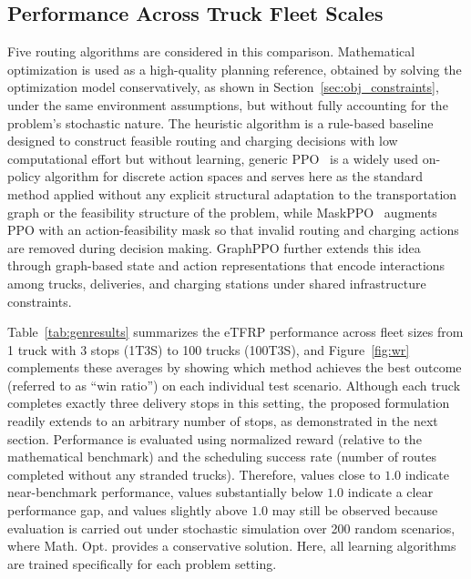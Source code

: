 \documentclass[a4paper,fleqn]{cas-sc}
\begin{document}
\subsection{Performance Across Truck Fleet Scales}

Five routing algorithms are considered in this comparison. Mathematical optimization is used as a high-quality planning reference, obtained by solving the optimization model conservatively, as shown in Section~\ref{sec:obj_constraints}, under the same environment assumptions, but without fully accounting for the problem's stochastic nature.
The heuristic algorithm is a rule-based baseline designed to construct feasible routing and charging decisions with low computational effort but without learning, generic PPO~\cite{ppo} is a widely used on-policy algorithm for discrete action spaces and serves here as the standard method applied without any explicit structural adaptation to the transportation graph or the feasibility structure of the problem, while MaskPPO~\cite{maskppo} augments PPO with an action-feasibility mask so that invalid routing and charging actions are removed during decision making. GraphPPO further extends this idea through graph-based state and action representations that encode interactions among trucks, deliveries, and charging stations under shared infrastructure constraints.

Table~\ref{tab:genresults} summarizes the eTFRP performance across fleet sizes from  1 truck with 3 stops (1T3S) to 100 trucks (100T3S), and Figure~\ref{fig:wr} complements these averages by showing which method achieves the best outcome (referred to as ``win ratio'') on each individual test scenario.
Although each truck completes exactly three delivery stops in this setting, the proposed formulation readily extends to an arbitrary number of stops, as demonstrated in the next section.
Performance is evaluated using normalized reward (relative to the mathematical benchmark) and the scheduling success rate (number of routes completed without any stranded trucks). Therefore, values close to $1.0$ indicate near-benchmark performance, values substantially below $1.0$ indicate a clear performance gap, and values slightly above $1.0$ may still be observed because evaluation is carried out under stochastic simulation over 200 random scenarios, where Math. Opt. provides a conservative solution. Here, all learning algorithms are trained specifically for each problem setting.
\end{document}
